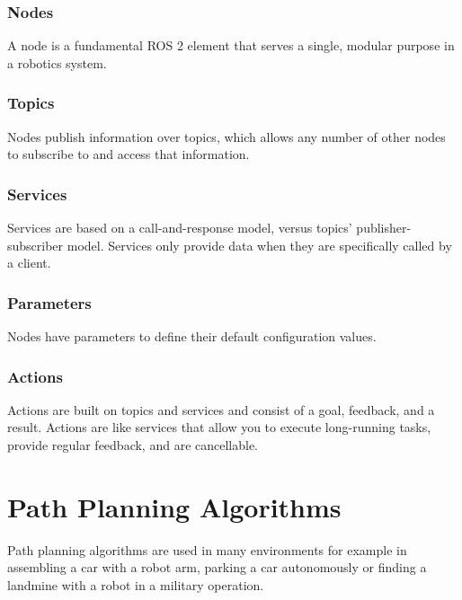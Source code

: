 \subsubsection{Nodes}
A node is a fundamental ROS 2 element that serves a single, modular purpose in a robotics system. %

\subsubsection{Topics}
 Nodes publish information over topics, which allows any number of other nodes to subscribe to and access that information. %

\subsubsection{Services}
Services are based on a call-and-response model, versus topics’ publisher-subscriber model. Services only provide data when they are specifically called by a client. %

\subsubsection{Parameters}
Nodes have parameters to define their default configuration values. %

\subsubsection{Actions}
Actions are built on topics and services and consist of a goal, feedback, and a result. Actions are like services that allow you to execute long-running tasks, provide regular feedback, and are cancellable. %

\section{Path Planning Algorithms}
Path planning algorithms are used in many environments for example in assembling a car with a robot arm, parking a car autonomously or finding a landmine with a robot in a military operation. 

